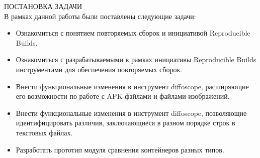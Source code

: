 {\centering
%
\SuperFont\MakeTextUppercase{Постановка задачи}\\
}
\vspace{32pt}
В рамках данной работы были поставлены следующие задачи:
\begin{itemize}
\item Ознакомиться с понятием повторяемых сборок и инициативой Reproducible Builds.
\item Ознакомиться с разрабатываемыми в рамках инициативы Reproducible Builds инструментами для обеспечения повторяемых сборок.
\item Внести функциональные изменения в инструмент diffoscope, расширяющие его возможности по работе с APK-файлами и файлами изображений.
\item Внести функциональные изменения в инструмент diffoscope, позволяющие идентифицировать различия, заключающиеся в разном порядке строк в текстовых файлах.
\item Разработать прототип модуля сравнения контейнеров разных типов.
\end{itemize}
